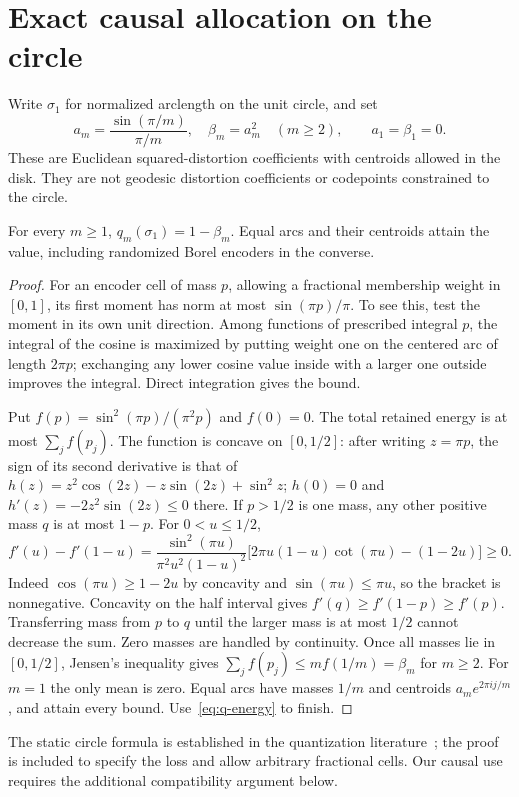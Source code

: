 \section{Exact causal allocation on the circle}\label{sec:circle}
Write $\sigma_1$ for normalized arclength on the unit circle, and set
\begin{equation}\label{eq:circle-beta}
 a_m=\frac{\sin(\pi/m)}{\pi/m},\quad\beta_m=a_m^2\quad(m\ge2),
 \qquad a_1=\beta_1=0.
\end{equation}
These are Euclidean squared-distortion coefficients with centroids allowed in the disk. They are not geodesic distortion coefficients or codepoints constrained to the circle.

\begin{lemma}\label{lem:circle}
For every $m\ge1$, $q_m(\sigma_1)=1-\beta_m$. Equal arcs and their centroids attain the value, including randomized Borel encoders in the converse.
\end{lemma}
\begin{proof}
For an encoder cell of mass $p$, allowing a fractional membership weight in $[0,1]$, its first moment has norm at most $\sin(\pi p)/\pi$. To see this, test the moment in its own unit direction. Among functions of prescribed integral $p$, the integral of the cosine is maximized by putting weight one on the centered arc of length $2\pi p$; exchanging any lower cosine value inside with a larger one outside improves the integral. Direct integration gives the bound.

Put $f(p)=\sin^2(\pi p)/(\pi^2p)$ and $f(0)=0$. The total retained energy is at most $\sum_j f(p_j)$. The function is concave on $[0,1/2]$: after writing $z=\pi p$, the sign of its second derivative is that of
$h(z)=z^2\cos(2z)-z\sin(2z)+\sin^2z$;
$h(0)=0$ and $h'(z)=-2z^2\sin(2z)\le0$ there.
If $p>1/2$ is one mass, any other positive mass $q$ is at most $1-p$. For $0<u\le1/2$,
\[
 f'(u)-f'(1-u)
 =\frac{\sin^2(\pi u)}{\pi^2u^2(1-u)^2}
 \bigl[2\pi u(1-u)\cot(\pi u)-(1-2u)\bigr]\ge0.
\]
Indeed $\cos(\pi u)\ge1-2u$ by concavity and $\sin(\pi u)\le\pi u$, so the bracket is nonnegative. Concavity on the half interval gives $f'(q)\ge f'(1-p)\ge f'(p)$. Transferring mass from $p$ to $q$ until the larger mass is at most $1/2$ cannot decrease the sum. Zero masses are handled by continuity. Once all masses lie in $[0,1/2]$, Jensen's inequality gives $\sum_j f(p_j)\le m f(1/m)=\beta_m$ for $m\ge2$. For $m=1$ the only mean is zero. Equal arcs have masses $1/m$ and centroids $a_m e^{2\pi i j/m}$, and attain every bound. Use~\eqref{eq:q-energy} to finish.
\end{proof}
The static circle formula is established in the quantization literature~\cite{RosenblattRoychowdhury}; the proof is included to specify the loss and allow arbitrary fractional cells. Our causal use requires the additional compatibility argument below.

